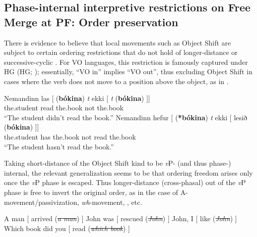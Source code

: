 \documentclass[output=paper]{langsci/langscibook}
\begin{document}
\subsection{Phase-internal interpretive restrictions on Free Merge at PF: Order
preservation}\label{sub:key:22.2.1}

There is evidence to believe that local movements such as Object Shift are
subject to certain ordering restrictions that do not hold of longer-distance or
successive-cyclic . For VO languages, this restriction is famously
captured under \glsdesc{HG} (\gls{HG};
\citealt{Holmberg1986,Holmberg1999}); essentially, \enquote{VO in} implies \enquote{VO out},
thus excluding Object Shift in cases where the verb does not move to a position
above the object, as in .

\ea\label{ex:key:22.5} 
    \ea\label{ex:key:22.5a}
        \gll    Nemandinn  las   [\emph{} (\textbf{bókina}) \emph{t} ekki [ \emph{t} (\textbf{bókina}) ]] \\
                the.student read {} \hphantom{(}the.book {} not {} {} \hphantom{(}the.book\\
        \glt \enquote{The student didn't read the book.}
    \ex\label{ex:key:22.5b}
        \gll    Nemandinn hefur [\emph{} (\textbf{*bókina}) \emph{t} ekki [ lesið (\textbf{bókina}) ]]\\
                the.student has {} \hphantom{(*}the.book {} not {} read \hphantom{(}the.book\\
        \glt \enquote{The student hasn't read the book.}
    \z
\z

Taking short-distance  of the Object Shift kind to be \emph{v}P- (and
thus phase-) internal, the relevant generalization seems to be that ordering
freedom arises only once the \emph{v}P phase is escaped. Thus longer-distance
(cross-phasal)  out of the \emph{v}P phase is free to invert the
original order, as in the case of A-movement/passivization, \emph{wh}-movement,
, etc.\largerpage

\ea\label{ex:key:22.6}
\ea  A man [\emph{} arrived (\sout{\emph{a man}}) ]
\ex John was [\emph{} rescued (\sout{\emph{John}}) ]
\ex John, I [\emph{} like (\sout{\emph{John}}) ]
    \ex Which book did you [\emph{} read (\sout{\emph{which
    book}}) ]
    \z
\z
\end{document}
